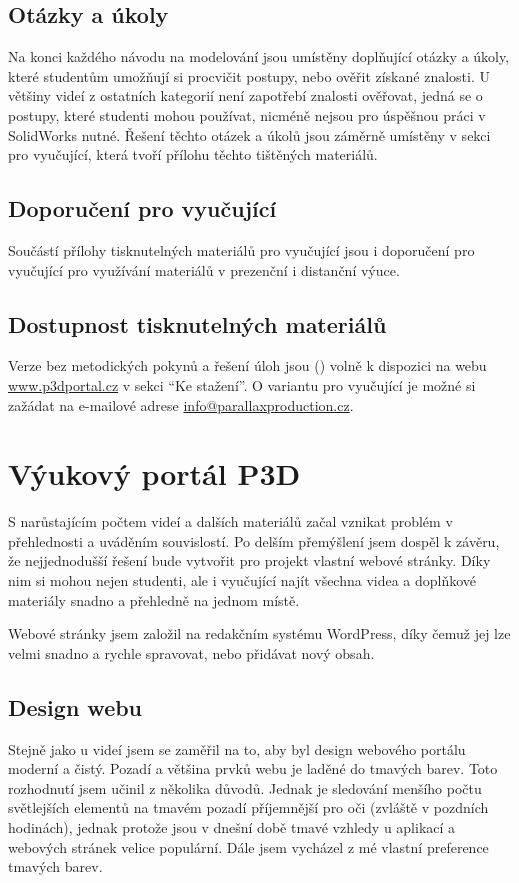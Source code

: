 \subsection{Otázky a úkoly}
Na konci každého návodu na modelování jsou umístěny doplňující otázky a úkoly, které studentům umožňují si procvičit postupy, nebo ověřit získané znalosti.
U většiny videí z ostatních kategorií není zapotřebí znalosti ověřovat, jedná se o postupy, které studenti mohou používat, nicméně nejsou pro úspěšnou práci v SolidWorks nutné.
Řešení těchto otázek a úkolů jsou záměrně umístěny v sekci pro vyučující, která tvoří přílohu těchto tištěných materiálů.

\subsection*{Doporučení pro vyučující}
Součástí přílohy tisknutelných materiálů pro vyučující jsou i doporučení pro vyučující pro využívání materiálů v prezenční i distanční výuce.

\subsection{Dostupnost tisknutelných materiálů}
Verze bez metodických pokynů a řešení úloh jsou (\fxnote[inline=true]{\textcolor{red}{BUDOU}}) volně k dispozici na webu \href{https://www.p3dportal.cz}{www.p3dportal.cz} v sekci \enquote{Ke stažení}.
O variantu pro vyučující je možné si zažádat na e-mailové adrese \href{mailto:info@parallaxproduction.cz}{info@parallaxproduction.cz}.

\section{Výukový portál P3D}
S narůstajícím počtem videí a dalších materiálů začal vznikat problém v přehlednosti a uváděním souvislostí.
Po delším přemýšlení jsem dospěl k závěru, že nejjednodušší řešení bude vytvořit pro projekt vlastní webové stránky.
Díky nim si mohou nejen studenti, ale i vyučující najít všechna videa a doplňkové materiály snadno a přehledně na jednom místě.

Webové stránky jsem založil na redakčním systému WordPress, díky čemuž jej lze velmi snadno a rychle spravovat, nebo přidávat nový obsah.

\subsection{Design webu}
Stejně jako u videí jsem se zaměřil na to, aby byl design webového portálu moderní a čistý.
Pozadí a většina prvků webu je laděné do tmavých barev.
Toto rozhodnutí jsem učinil z několika důvodů.
Jednak je sledování menšího počtu světlejších elementů na tmavém pozadí příjemnější pro oči (zvláště v pozdních hodinách), jednak protože jsou v dnešní době tmavé vzhledy u aplikací a webových stránek velice populární.
Dále jsem vycházel z mé vlastní preference tmavých barev.

